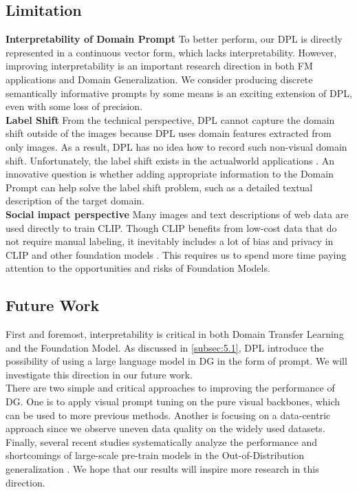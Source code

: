 \documentclass[11pt,twocolumn]{article}
\begin{document}
\subsection{Limitation}
\label{subsec:5.1}
\textbf{Interpretability of Domain Prompt}  To better perform, our DPL is directly represented in a continuous vector form, which lacks interpretability. However, improving interpretability is an important research direction in both FM applications and Domain Generalization. We consider producing discrete semantically informative prompts by some means is an exciting extension of DPL, even with some loss of precision.\\
\textbf{Label Shift}    From the technical perspective, DPL cannot capture the domain shift outside of the images because DPL uses domain features extracted from only images. As a result, DPL has no idea how to record such non-visual domain shift. Unfortunately, the label shift exists in the actualworld applications \cite{azizzadenesheli2019regularized}. An innovative question is whether adding appropriate information to the Domain Prompt can help solve the label shift problem, such as a detailed textual description of the target domain.\\
\textbf{Social impact perspective}  Many images and text descriptions of web data are used directly to train CLIP. Though CLIP benefits from low-cost data that do not require manual labeling, it inevitably includes a lot of bias and privacy in CLIP and other foundation models \cite{bommasani2021opportunities}. This requires us to spend more time paying attention to the opportunities and risks of Foundation Models.

\subsection{Future Work}
First and foremost, interpretability is critical in both Domain Transfer Learning and the Foundation Model. As discussed in \autoref{subsec:5.1}, DPL introduce the possibility of using a large language model in DG in the form of prompt. We will investigate this direction in our future work.\\
\hspace{1cm}
There are two simple and critical approaches to improving the performance of DG. One is to apply visual prompt tuning \cite{jia2022visual} on the pure visual backbones, which can be used to more previous methods. Another is focusing on a data-centric approach since we observe uneven data quality on the widely used datasets.\\
\hspace{1cm}
Finally, several recent studies systematically analyze the performance and shortcomings of large-scale pre-train models in the Out-of-Distribution generalization \cite{cha2022domain,wenzel2022assaying}. We hope that our results will inspire more research in this direction.


\end{document}
